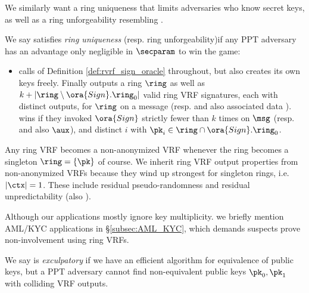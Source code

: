 We similarly want a ring uniqueness that limits adversaries who know secret keys,
as well as a ring unforgeability resembling \cite[pp. 7 Def. 7]{cryptoeprint:2005:304}. %

\begin{definition}
We say \rVRF satisfies {\em ring uniqueness} (resp. ring unforgeability)if
any PPT adversary \adv has an advantage only
 negligible in $\secparam$ to win the game:
\begin{itemize}
\item[]
 \adv calls  of Definition \ref{def:rvrf_sign_oracle} throughout,
 but also creates its own keys freely.
 Finally \adv outputs a ring $\ring$ as well as
 $k + |\ring \setminus \ora{Sign}.\ring_0|$ valid ring VRF signatures,
  each with distinct outputs,    %
 for $\ring$ on a message \msg (resp. and also associated data \aux).
 \adv wins if they invoked $\ora{Sign}$ strictly fewer than $k$ times
 on $\msg$ (resp. and also $\aux$), and
  distinct $i$ with $\pk_i \in \ring \cap \ora{Sign}.\ring_0$.
\end{itemize}
\end{definition}
 
Any ring VRF becomes a non-anonymized VRF whenever
 the ring becomes a singleton $\ring = \{ \pk \}$ of course.
We inherit ring VRF output properties from non-anonymized VRFs
because they wind up strongest for singleton rings, i.e. $|\ctx| = 1$.
These include 
 residual pseudo-randomness \cite[Def. VRF (3) \S3.2, pp. 4]{vrf_micali} and
 residual unpredictability \cite[Def. VUF (3) \S3.2, pp. 5]{vrf_micali}
  (also \cite[Def. 4, pp. 8]{agg_dgk}).

\smallskip %

Although our applications   mostly ignore key multiplicity. 
we briefly mention AML/KYC applications in \S\ref{subsec:AML_KYC},
which demands suspects prove non-involvement using ring VRFs.

\begin{definition}\label{def:rvrf_exculpability}
We say \rVRF is {\em exculpatory} if we have an efficient algorithm
for equivalence of public keys, but a PPT adversary \adv cannot
find non-equivalent public keys $\pk_0,\pk_1$ with colliding VRF outputs.
\end{definition} 



